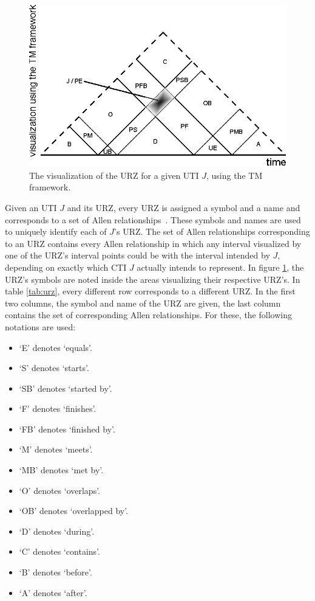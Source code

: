 \begin{figure}[h]
	\centering
	\includegraphics[width=0.9\columnwidth]{graphs/TM_model_URZ.eps}
	\caption{The visualization of the URZ for a given UTI $J$, using the TM framework.}
	\label{fig:tm-urz}
\end{figure}

Given an UTI $J$ and its URZ, every URZ is assigned a symbol and a name and corresponds to a set of Allen relationships~\cite{DeTre2012}. These symbols and names are used to uniquely identify each of $J$'s URZ. The set of Allen relationships corresponding to an URZ contains every Allen relationship in which any interval visualized by one of the URZ's interval points could be with the interval intended by $J$, depending on exactly which CTI $J$ actually intends to represent. In figure \ref{fig:tm-urz}, the URZ's symbols are noted inside the areas visualizing their respective URZ's. In table \ref{tab:urz}, every different row corresponds to a different URZ. In the first two columns, the symbol and name of the URZ are given, the last column contains the set of corresponding Allen relationships. For these, the following notations are used:

\begin{itemize}
	\item `E' denotes `equals'.
	\item `S' denotes `starts'.
	\item `SB' denotes `started by'.
	\item `F' denotes `finishes'.
	\item `FB' denotes `finished by'.
	\item `M' denotes `meets'.
	\item `MB' denotes `met by'.
	\item `O' denotes `overlaps'.
	\item `OB' denotes `overlapped by'.
	\item `D' denotes `during'.
	\item `C' denotes `contains'.
	\item `B' denotes `before'.
	\item `A' denotes `after'.
\end{itemize}


